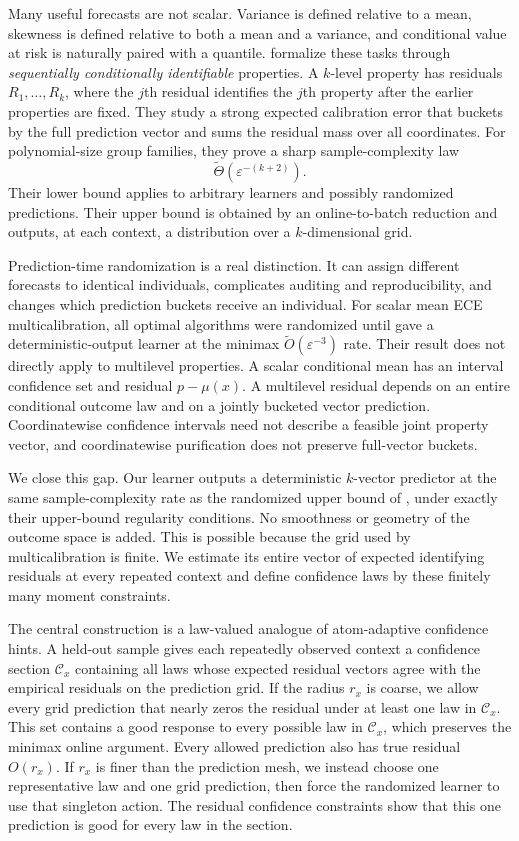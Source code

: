\documentclass{article}
\theoremstyle{definition}
\theoremstyle{remark}
\newcommand{\1}{\mathbf 1}
\newcommand{\cC}{\mathcal C}
\begin{document}
Many useful forecasts are not scalar. Variance is defined relative to a mean, skewness is defined relative to both a mean and a variance, and conditional value at risk is naturally paired with a quantile. \citet{lu2026multilevel} formalize these tasks through \emph{sequentially conditionally identifiable} properties. A $k$-level property has residuals $R_1,\ldots,R_k$, where the $j$th residual identifies the $j$th property after the earlier properties are fixed. They study a strong expected calibration error that buckets by the full prediction vector and sums the residual mass over all coordinates. For polynomial-size group families, they prove a sharp sample-complexity law
\[
\widetilde\Theta(\varepsilon^{-(k+2)}).
\]
Their lower bound applies to arbitrary learners and possibly randomized predictions. Their upper bound is obtained by an online-to-batch reduction and outputs, at each context, a distribution over a $k$-dimensional grid.

Prediction-time randomization is a real distinction. It can assign different forecasts to identical individuals, complicates auditing and reproducibility, and changes which prediction buckets receive an individual. For scalar mean ECE multicalibration, all optimal algorithms were randomized until \citet{noarovroth2026deterministic} gave a deterministic-output learner at the minimax $\widetilde O(\varepsilon^{-3})$ rate. Their result does not directly apply to multilevel properties. A scalar conditional mean has an interval confidence set and residual $p-\mu(x)$. A multilevel residual depends on an entire conditional outcome law and on a jointly bucketed vector prediction. Coordinatewise confidence intervals need not describe a feasible joint property vector, and coordinatewise purification does not preserve full-vector buckets.

We close this gap. Our learner outputs a deterministic $k$-vector predictor at the same sample-complexity rate as the randomized upper bound of \citet{lu2026multilevel}, under exactly their upper-bound regularity conditions. No smoothness or geometry of the outcome space is added. This is possible because the grid used by multicalibration is finite. We estimate its entire vector of expected identifying residuals at every repeated context and define confidence laws by these finitely many moment constraints.

The central construction is a law-valued analogue of atom-adaptive confidence hints. A held-out sample gives each repeatedly observed context a confidence section $\cC_x$ containing all laws whose expected residual vectors agree with the empirical residuals on the prediction grid. If the radius $r_x$ is coarse, we allow every grid prediction that nearly zeros the residual under at least one law in $\cC_x$. This set contains a good response to every possible law in $\cC_x$, which preserves the minimax online argument. Every allowed prediction also has true residual $O(r_x)$. If $r_x$ is finer than the prediction mesh, we instead choose one representative law and one grid prediction, then force the randomized learner to use that singleton action. The residual confidence constraints show that this one prediction is good for every law in the section.
\end{document}
